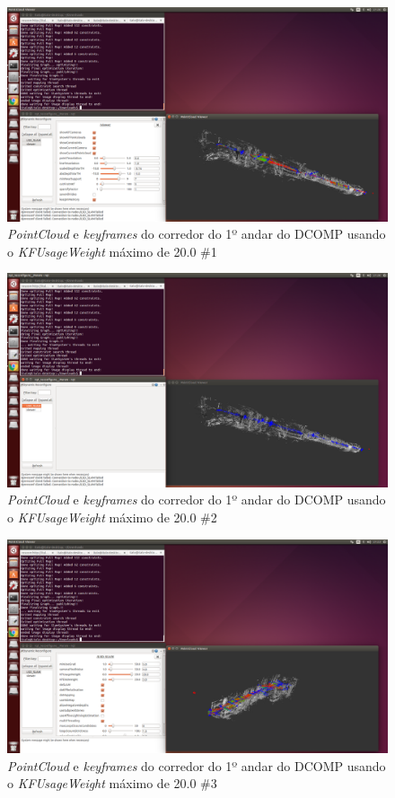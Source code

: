 \begin{figure}[H]
	\centering
		\includegraphics[width= \textwidth]{Imagens/figura3-34.png}
	\caption{\textit{PointCloud} e \textit{keyframes} do corredor do 1º andar do DCOMP usando o \textit{KFUsageWeight} máximo de 20.0 \#1}
	\label{fig3:32}
\end{figure}

\begin{figure}[H]
	\centering
		\includegraphics[width= \textwidth]{Imagens/figura3-35}
	\caption{\textit{PointCloud} e \textit{keyframes} do corredor do 1º andar do DCOMP usando o \textit{KFUsageWeight} máximo de 20.0 \#2}
	\label{fig3:33}
\end{figure}


\begin{figure}[H]
	\centering
		\includegraphics[width= \textwidth]{Imagens/figura3-36.png}
	\caption{\textit{PointCloud} e \textit{keyframes} do corredor do 1º andar do DCOMP usando o \textit{KFUsageWeight} máximo de 20.0 \#3}
	\label{fig3:34}
\end{figure}



